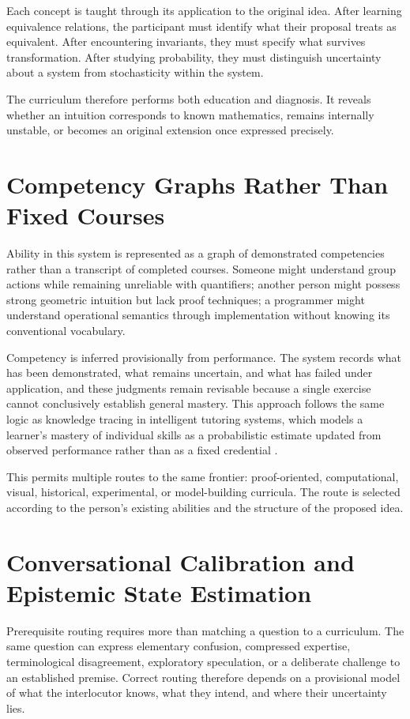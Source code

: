 \documentclass[11pt]{article}
\begin{document}
Each concept is taught through its application to the original idea. After learning equivalence relations, the participant must identify what their proposal treats as equivalent. After encountering invariants, they must specify what survives transformation. After studying probability, they must distinguish uncertainty about a system from stochasticity within the system.

The curriculum therefore performs both education and diagnosis. It reveals whether an intuition corresponds to known mathematics, remains internally unstable, or becomes an original extension once expressed precisely.

\section{Competency Graphs Rather Than Fixed Courses}

Ability in this system is represented as a graph of demonstrated competencies rather than a transcript of completed courses. Someone might understand group actions while remaining unreliable with quantifiers; another person might possess strong geometric intuition but lack proof techniques; a programmer might understand operational semantics through implementation without knowing its conventional vocabulary.

Competency is inferred provisionally from performance. The system records what has been demonstrated, what remains uncertain, and what has failed under application, and these judgments remain revisable because a single exercise cannot conclusively establish general mastery. This approach follows the same logic as knowledge tracing in intelligent tutoring systems, which models a learner's mastery of individual skills as a probabilistic estimate updated from observed performance rather than as a fixed credential \cite{corbett1994}.

This permits multiple routes to the same frontier: proof-oriented, computational, visual, historical, experimental, or model-building curricula. The route is selected according to the person's existing abilities and the structure of the proposed idea.

\section{Conversational Calibration and Epistemic State Estimation}

Prerequisite routing requires more than matching a question to a curriculum. The same question can express elementary confusion, compressed expertise, terminological disagreement, exploratory speculation, or a deliberate challenge to an established premise. Correct routing therefore depends on a provisional model of what the interlocutor knows, what they intend, and where their uncertainty lies.
\end{document}
